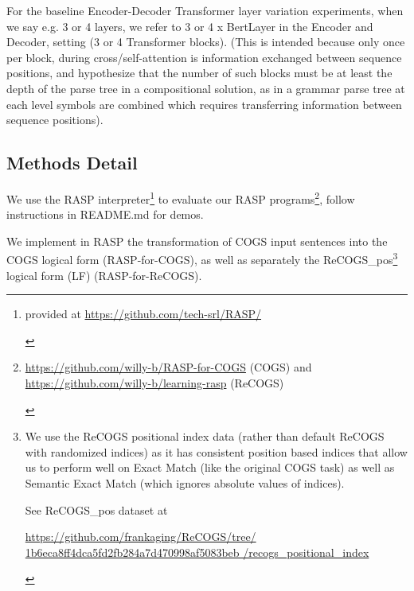 \documentclass[11pt]{article}
\begin{document}
For the \citep{Wu2023} baseline Encoder-Decoder Transformer layer variation experiments, 
when we say e.g. 3 or 4 layers, we refer to 3 or 4 x BertLayer in the Encoder and Decoder, setting (3 or 4 Transformer blocks).
(This is intended because only once per block, during cross/self-attention is information exchanged between sequence positions, and \citep{Csordas2022} hypothesize that the number of such blocks must be at least the depth of the parse tree in a compositional solution, as in a grammar parse tree at each level symbols are combined which requires transferring information between sequence positions).

\subsection{Methods Detail}
\label{methods_detail}

We use the RASP \citep{Weiss2021} interpreter\footnote{\begin{footnotesize}provided at \href{https://github.com/tech-srl/RASP/}{https://github.com/tech-srl/RASP/}
\end{footnotesize}
} to evaluate our RASP programs\footnote{\begin{footnotesize}\href{https://github.com/willy-b/RASP-for-COGS}{https://github.com/willy-b/RASP-for-COGS} (COGS) and \href{https://github.com/willy-b/learning-rasp}{https://github.com/willy-b/learning-rasp} (ReCOGS)\end{footnotesize}}, follow instructions in README.md for demos.

We implement in RASP the transformation of COGS input sentences into the COGS logical form (RASP-for-COGS), as well as separately the ReCOGS\_pos\footnote{
\begin{footnotesize}We use the ReCOGS positional index data (rather than default ReCOGS with randomized indices) as it has consistent position based indices that allow us to perform well on Exact Match (like the original COGS task) as well as Semantic Exact Match (which ignores absolute values of indices).

See ReCOGS\_pos dataset at 

\href{https://github.com/frankaging/ReCOGS/tree/1b6eca8ff4dca5fd2fb284a7d470998af5083beb/recogs\_positional\_index}{https://github.com/frankaging/ReCOGS/tree/
1b6eca8ff4dca5fd2fb284a7d470998af5083beb
/recogs\_positional\_index}\end{footnotesize}
} logical form (LF) (RASP-for-ReCOGS).
\end{document}
